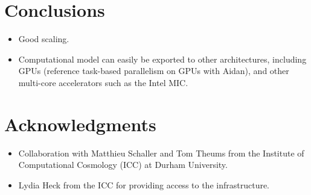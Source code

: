 \documentclass[final]{siamltex}
\begin{document}
\section{Conclusions}

\begin{itemize}

    \item Good scaling.
    
    \item Computational model can easily be exported to other architectures,
        including GPUs (reference task-based parallelism on GPUs with Aidan),
        and other multi-core accelerators such as the Intel MIC.
        
\end{itemize}


\section*{Acknowledgments}

\begin{itemize}

    \item Collaboration with Matthieu Schaller and Tom Theums from the
        Institute of Computational Cosmology (ICC) at Durham University.
        
    \item Lydia Heck from the ICC for providing access to the infrastructure.

\end{itemize}


\nopagebreak

\end{document}
